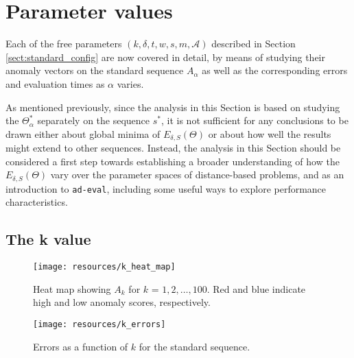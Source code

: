 \clearpage

\section{Parameter values}
\label{sect:params}

Each of the free parameters $(k, \delta, t, w, s, m, \mathcal{A})$ described in Section \ref{sect:standard_config} are now covered in detail, by means of studying their anomaly vectors on the standard sequence $A_\alpha$ as well as the corresponding errors and evaluation times as $\alpha$ varies.

As mentioned previously, since the analysis in this Section is based on studying the $\Theta_{\alpha}^*$ separately on the sequence $s^*$, it is not sufficient for any conclusions to be drawn either about global minima of $E_{\delta, S}(\Theta)$ or about how well the results might extend to other sequences. Instead, the analysis in this Section should be considered a first step towards establishing a broader understanding of how the $E_{\delta, S}(\Theta)$ vary over the parameter spaces of distance-based problems, and as an introduction to \texttt{ad-eval}, including some useful ways to explore performance characteristics.

\subsection{The k value}
\FloatBarrier

\begin{figure}[h]
    \vspace{-10pt}
    \begin{center}
        \texttt{[image: resources/k\_heat\_map]}
    \end{center}
    \vspace{-20pt}
    \caption{\small{Heat map showing $A_k$ for $k$ = $1, 2, \dots, 100$. Red and blue indicate high and low anomaly scores, respectively.}}
    \label{fig:k_heat_map}
\end{figure}

\begin{wrapfigure}{r}{0.5\textwidth}
    \vspace{-30pt}
    \begin{center}
        \texttt{[image: resources/k\_errors]}
    \end{center}
    \vspace{-20pt}
    \caption{\small{Errors as a function of $k$ for the standard sequence.}}
    \label{fig:k_errors}
    \vspace{-10pt}
\end{wrapfigure}

